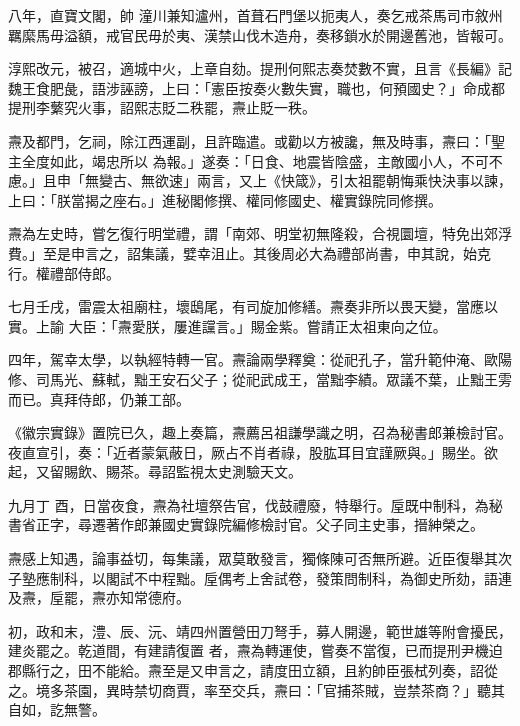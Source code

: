 \begin{pinyinscope}
 八年，直寶文閣，帥
 潼川兼知瀘州，首葺石門堡以扼夷人，奏乞戒茶馬司市敘州羈縻馬毋溢額，戒官民毋於夷、漢禁山伐木造舟，奏移鎖水於開邊舊池，皆報可。



 淳熙改元，被召，適城中火，上章自劾。提刑何熙志奏焚數不實，且言《長編》記魏王食肥彘，語涉誣謗，上曰：「憲臣按奏火數失實，職也，何預國史？」命成都提刑李蘩究火事，詔熙志貶二秩罷，燾止貶一秩。



 燾及都門，乞祠，除江西運副，且許臨遣。或勸以方被讒，無及時事，燾曰：「聖主全度如此，竭忠所以
 為報。」遂奏：「日食、地震皆陰盛，主敵國小人，不可不慮。」且申「無變古、無欲速」兩言，又上《快箴》，引太祖罷朝悔乘快決事以諫，上曰：「朕當揭之座右。」進秘閣修撰、權同修國史、權實錄院同修撰。



 燾為左史時，嘗乞復行明堂禮，謂「南郊、明堂初無隆殺，合視圜壇，特免出郊浮費。」至是申言之，詔集議，嬖幸沮止。其後周必大為禮部尚書，申其說，始克行。權禮部侍郎。



 七月壬戌，雷震太祖廟柱，壞鴟尾，有司旋加修繕。燾奏非所以畏天變，當應以實。上諭
 大臣：「燾愛朕，屢進讜言。」賜金紫。嘗請正太祖東向之位。



 四年，駕幸太學，以執經特轉一官。燾論兩學釋奠：從祀孔子，當升範仲淹、歐陽修、司馬光、蘇軾，黜王安石父子；從祀武成王，當黜李績。眾議不葉，止黜王雱而已。真拜侍郎，仍兼工部。



 《徽宗實錄》置院已久，趣上奏篇，燾薦呂祖謙學識之明，召為秘書郎兼檢討官。夜直宣引，奏：「近者蒙氣蔽日，厥占不肖者祿，股肱耳目宜謹厥與。」賜坐。欲起，又留賜飲、賜茶。尋詔監視太史測驗天文。



 九月丁
 酉，日當夜食，燾為社壇祭告官，伐鼓禮廢，特舉行。垕既中制科，為秘書省正字，尋遷著作郎兼國史實錄院編修檢討官。父子同主史事，搢紳榮之。



 燾感上知遇，論事益切，每集議，眾莫敢發言，獨條陳可否無所避。近臣復舉其次子塾應制科，以閣試不中程黜。垕偶考上舍試卷，發策問制科，為御史所劾，語連及燾，垕罷，燾亦知常德府。



 初，政和末，澧、辰、沅、靖四州置營田刀弩手，募人開邊，範世雄等附會擾民，建炎罷之。乾道間，有建請復置
 者，燾為轉運使，嘗奏不當復，已而提刑尹機迫郡縣行之，田不能給。燾至是又申言之，請度田立額，且約帥臣張栻列奏，詔從之。境多茶園，異時禁切商賈，率至交兵，燾曰：「官捕茶賊，豈禁茶商？」聽其自如，訖無警。




\end{pinyinscope}
